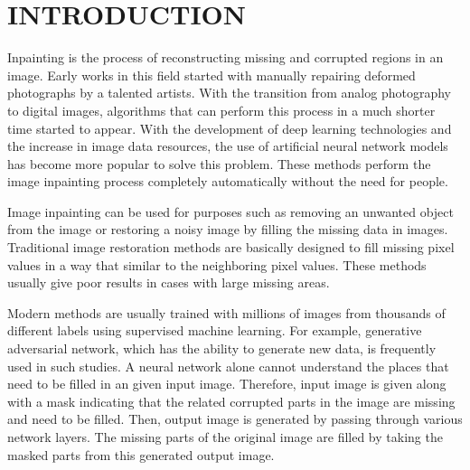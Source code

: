 \chapter{INTRODUCTION}\label{introduction}


Inpainting is the process of reconstructing missing and corrupted regions in an image. Early works in this field started with manually repairing deformed photographs by a talented artists. With the transition from analog photography to digital images, algorithms that can perform this process in a much shorter time started to appear. With the development of deep learning technologies and the increase in image data resources, the use of artificial neural network models has become more popular to solve this problem. These methods perform the image inpainting process completely automatically without the need for people.

Image inpainting can be used for purposes such as removing an unwanted object from the image or restoring a noisy image by filling the missing data in images. Traditional image restoration methods are basically designed to fill missing pixel values in a way that similar to the neighboring pixel values. These methods usually give poor results in cases with large missing areas.

Modern methods are usually trained with millions of images from thousands of different labels using supervised machine learning. For example, generative adversarial network, which has the ability to generate new data, is frequently used in such studies. A neural network alone cannot understand the places that need to be filled in an given input image. Therefore, input image is given along with a mask indicating that the related corrupted parts in the image are missing and need to be filled. Then, output image is generated by passing through various network layers. The missing parts of the original image are filled by taking the masked parts from this generated output image.
